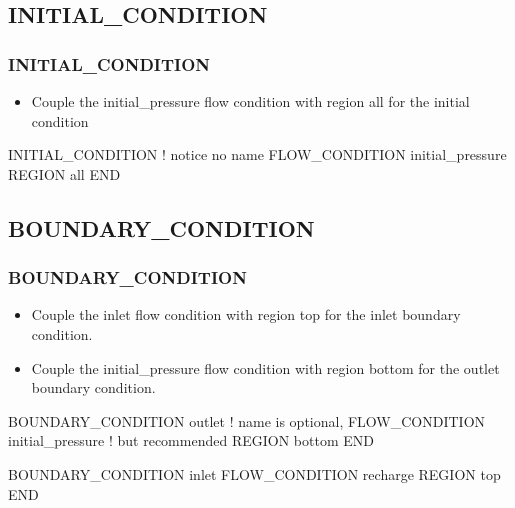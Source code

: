 \documentclass{beamer}
\newcommand\redcomment[1]{{{\color{red} #1}}}
\newcommand\bluecomment[1]{{{\color{blue} #1}}}
\newcommand\greencomment[1]{{{\color{green} #1}}}
\begin{document}
\subsection{INITIAL\_CONDITION}

\begin{frame}[fragile]\frametitle{INITIAL\_CONDITION}

\begin{itemize}
\item Couple the \greencomment{initial\_pressure} flow condition with region \greencomment{all} for the initial condition
\end{itemize}

\begin{semiverbatim}

INITIAL_CONDITION           \bluecomment{! notice no name}
  FLOW_CONDITION initial_pressure
  REGION all
END

\end{semiverbatim}

\end{frame}

\subsection{BOUNDARY\_CONDITION}

\begin{frame}[fragile]\frametitle{BOUNDARY\_CONDITION}

\begin{itemize}
\item Couple the \greencomment{inlet} flow condition with region \greencomment{top} for the \redcomment{inlet} boundary condition.
\item Couple the \greencomment{initial\_pressure} flow condition with region \greencomment{bottom} for the \redcomment{outlet} boundary condition.
\end{itemize}

\begin{semiverbatim}

BOUNDARY_CONDITION outlet          \bluecomment{! name is optional,}
  FLOW_CONDITION initial_pressure  \bluecomment{!   but recommended}
  REGION bottom
END

BOUNDARY_CONDITION inlet
  FLOW_CONDITION recharge
  REGION top
END

\end{semiverbatim}

\end{frame}
\end{document}

